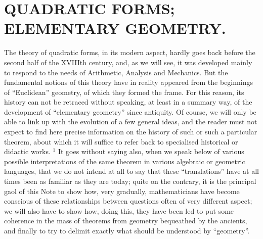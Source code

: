 \chapter{QUADRATIC FORMS; ELEMENTARY GEOMETRY.}

The theory of quadratic forms, in its modern aspect, hardly goes back before the second half of the XVIIIth century, and, as we will see, it was developed mainly to respond to the needs of Arithmetic, Analysis and Mechanics. But the fundamental notions of this theory have in reality appeared from the beginnings of ``Euclidean'' geometry, of which they formed the frame. For this reason, its history can not be retraced without speaking, at least in a summary way, of the development of ``elementary geometry'' since antiquity. Of course, we will only be able to link up with the evolution of a few general ideas, and the reader must not expect to find here precise information on the history of such or such a particular theorem, about which it will suffice to refer back to specialised historical or didactic works. \(^{1}\) It goes without saying also, when we speak below of various possible interpretations of the same theorem in various algebraic or geometric languages, that we do not intend at all to say that these ``translations'' have at all times been as familiar as they are today; quite on the contrary, it is the principal gaol of this Note to show how, very gradually, mathematicians have become conscious of these relationships between questions often of very different aspect; we will also have to show how, doing this, they have been led to put some coherence in the mass of theorems from geometry bequeathed by the ancients, and finally to try to delimit exactly what should be understood by ``geometry''.

